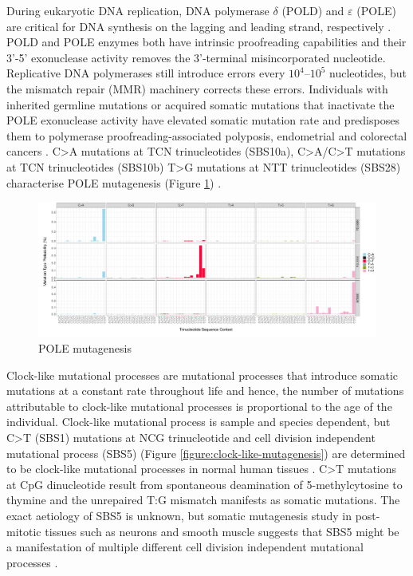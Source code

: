 During eukaryotic DNA replication, DNA polymerase $\delta$ (POLD) and $\varepsilon$ (POLE) are critical for DNA synthesis on the lagging and leading strand, respectively \cite{Swan2009-ew, Pursell2007-cu}. POLD and POLE enzymes both have intrinsic proofreading capabilities and their 3’-5’ exonuclease activity removes the 3’-terminal misincorporated nucleotide. Replicative DNA polymerases still introduce errors every $10^4 – 10^5$ nucleotides, but the mismatch repair (MMR) machinery corrects these errors. Individuals with inherited germline mutations or acquired somatic mutations that inactivate the POLE exonuclease activity have elevated somatic mutation rate and predisposes them to polymerase proofreading-associated polyposis, endometrial and colorectal cancers \cite{Palles2013-ua}. C>A mutations at TCN trinucleotides (SBS10a), C>A/C>T mutations at TCN trinucleotides (SBS10b) T>G mutations at NTT trinucleotides (SBS28) characterise POLE mutagenesis (Figure \ref{figure:pole-mutagenesis}) \cite{Robinson2021-te}. 

\begin{figure}[htbp!]
\caption{POLE mutagenesis}
\label{figure:pole-mutagenesis}
\begin{centering}
\includegraphics[width=\textwidth]{Vector/SBS10a_SBS10b_SBS28_sbs96.pdf}
\end{centering}
\end{figure}


Clock-like mutational processes are mutational processes that introduce somatic mutations at a constant rate throughout life and hence, the number of mutations attributable to clock-like mutational processes is proportional to the age of the individual. Clock-like mutational process is sample and species dependent, but C>T (SBS1) mutations at NCG trinucleotide and cell division independent mutational process (SBS5) (Figure \ref{figure:clock-like-mutagenesis}) are determined to be clock-like mutational processes in normal human tissues \cite{Alexandrov2015-db}. C>T mutations at CpG dinucleotide result from spontaneous deamination of 5-methylcytosine to thymine and the unrepaired T:G mismatch manifests as somatic mutations. The exact aetiology of SBS5 is unknown, but somatic mutagenesis study in post-mitotic tissues such as neurons and smooth muscle suggests that SBS5 might be a manifestation of multiple different cell division independent mutational processes \cite{Abascal2021-pk}.

